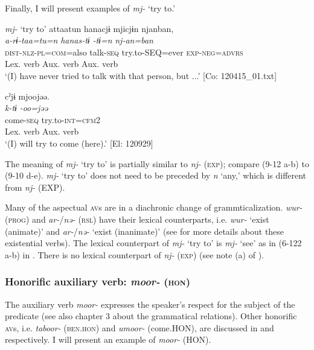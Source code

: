   Finally, I will present examples of \textit{mj-} ‘try to.’

\ea   \textit{mj-} ‘try to’ \label{ex:9.12}
\ea \label{ex:9.12a}%
 \gllll  attaatun  hanacjɨ  mjicjɨn  njanban,\\
      \textit{a-rɨ-taa=tu=n}  \textit{hanas-tɨ}  \textit{-tɨ=n}  \textit{nj-an=ban}\\
      \textsc{dist}-\textsc{nlz}-\textsc{pl}=\textsc{com}=also  talk-\textsc{seq}  try.to-SEQ=ever  \textsc{exp}-\textsc{neg}=\textsc{advrs}\\
      {}  {Lex. verb}  {Aux. verb}  {Aux. verb}\\
      \glt       ‘(I) have never tried to talk with that person, but ...’ [Co: 120415\_01.txt]

\ex \label{ex:9.12b} %
     \gllll  cˀjɨ  mjoojəə.\\
      \textit{k-tɨ}  \textit{-oo=jəə}\\
      come-\textsc{seq}  try.to-\textsc{int}=\textsc{cfm}2\\
      {Lex. verb}  {Aux. verb}\\
      \glt       ‘(I) will try to come (here).’ [El: 120929]
     \z
\z

The meaning of \textit{mj-} ‘try to’ is partially similar to \textit{nj-} (\textsc{exp}); compare (9-12 a-b) to (9-10 d-e). \textit{mj-} ‘try to’ does not need to be preceded by \textit{n} ‘any,’ which is different from \textit{nj-} (EXP).

  Many of the aspectual \textsc{av}s are in a diachronic change of grammticalization. \textit{wur-} (\textsc{prog}) and \textit{ar-}/\textit{nə-} (\textsc{rsl}) have their lexical counterparts, i.e. \textit{wur-} ‘exist (animate)’ and \textit{ar-}/\textit{nə-} ‘exist (inanimate)’ (see  for more details about these existential verbs). The lexical counterpart of \textit{mj-} ‘try to’ is \textit{mj-} ‘see’ as in (6-122 a-b) in . There is no lexical counterpart of \textit{nj-} (\textsc{exp}) (see note (a) of ).

\subsubsection{Honorific auxiliary verb: \textit{moor-} (\textsc{hon})}\label{sec:9.1.1.2}

The auxiliary verb \textit{moor-} expresses the speaker’s respect for the subject of the predicate (see also chapter 3 about the grammatical relations). Other honorific \textsc{av}s, i.e. \textit{taboor-} (\textsc{ben}.\textsc{hon}) and \textit{umoor-} (come.HON), are discussed in  and  respectively. I will present an example of \textit{moor-} (HON).

